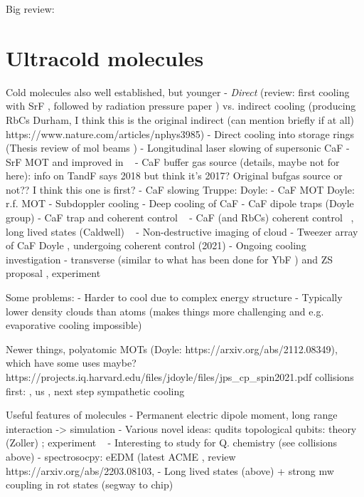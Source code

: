 Big review: \cite{2011Ac}

\section{Ultracold molecules}


Cold molecules also well established, but younger
- \emph{Direct} (review: \cite{Tarbutt2018} first cooling with SrF \cite{Shuman2009}, followed by
radiation pressure paper \cite{PhysRevLett.108.103002}) vs. indirect cooling
(producing RbCs Durham, I think this is the original indirect (can mention briefly if at all) \cite{PhysRevA.89.033604}
https://www.nature.com/articles/nphys3985)
- Direct cooling into storage rings (Thesis \cite{Crompvoets2005} review of mol beams \cite{vandeMeerakker2012})
- Longitudinal laser slowing of supersonic CaF \cite{PhysRevA.89.053416}
- SrF MOT \cite{Barry2014} and improved in ~\cite{PhysRevLett.116.063004}
- CaF buffer gas source (details, maybe not for here): \cite{Truppe2018} %
info on TandF says 2018 but think it's 2017? Original bufgas source
\cite{Barry2011} or not?? I think this one is first? \cite{Maxwell2005}
- CaF slowing Truppe: \cite{Truppe2017a} Doyle: \cite{0953-4075-49-17-174001}
- CaF MOT Doyle: r.f. MOT \cite{PhysRevLett.119.103201}
- Subdoppler cooling \cite{Truppe2017}
- Deep cooling of CaF \cite{PhysRevLett.123.033202}
- CaF dipole traps (Doyle group)
- CaF trap and coherent control ~\cite{WilliamsMagnetic2018}
- CaF (and RbCs) coherent control ~\cite{Blackmore_2018}, long lived states
(Caldwell) ~\cite{PhysRevLett.124.063001}
- Non-destructive imaging of cloud \cite{PhysRevLett.121.083201}
- Tweezer array of CaF Doyle \cite{Anderegg2019}, undergoing coherent control
\cite{PhysRevLett.127.123202} (2021)
- Ongoing cooling investigation - transverse (similar to what has been done for
YbF \cite{Alauze2021}) and ZS proposal \cite{Fitch2016}, experiment \cite{PhysRevLett.127.263002}

Some problems:
- Harder to cool due to complex energy structure
- Typically lower density clouds than atoms (makes things more challenging and
e.g. evaporative cooling impossible)

Newer things, polyatomic MOTs (Doyle: https://arxiv.org/abs/2112.08349),
which have some uses maybe? https://projects.iq.harvard.edu/files/jdoyle/files/jps_cp_spin2021.pdf
collisions first: \cite{son2019collisional}, us \cite{Jurgilas2021, JurgilasPRL_2021}, next step sympathetic cooling

Useful features of molecules
- Permanent electric dipole moment, long range interaction -> simulation
- Various novel ideas:
   qudits \cite{Sawant_2020}
   topological qubits: theory (Zoller) \cite{Micheli2006};  experiment ~\cite{Gross995}
- Interesting to study for Q. chemistry (see collisions above)
- spectrosocpy: eEDM
(latest ACME \cite{Andreev2018},
review https://arxiv.org/abs/2203.08103, 
- Long lived states (above) + strong mw coupling in rot states (segway to chip)



